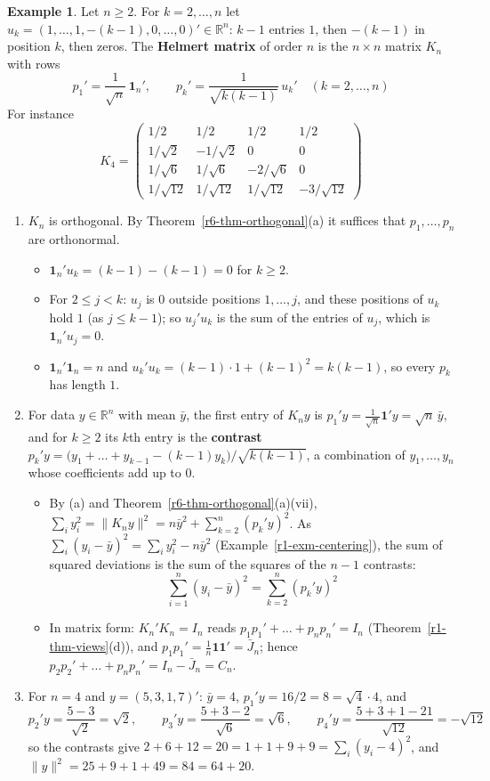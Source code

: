 \documentclass[12pt]{article}
\newcommand{\R}{\mathbb R}
\newcommand{\one}{\mathbf 1}
\theoremstyle{definition}
\newtheorem{example}[theorem]{Example}
\begin{document}
\begin{example}\label{r6-exm-helmert}
Let \(n\geqslant2\). For \(k=2,\dots,n\) let \(u_k=(1,\dots,1,-(k-1),0,\dots,0)'\in\R^n\): \(k-1\) entries \(1\),
then \(-(k-1)\) in position \(k\), then zeros. The \textbf{Helmert matrix} of order \(n\) is the \(n\times n\)
matrix \(K_n\) with rows
\[
p_1'=\frac1{\sqrt n}\,\one_n',\qquad p_k'=\frac1{\sqrt{k(k-1)}}\,u_k'\quad(k=2,\dots,n)
\]
For instance
\[
K_4=\begin{pmatrix}1/2&1/2&1/2&1/2\\1/\sqrt2&-1/\sqrt2&0&0\\1/\sqrt6&1/\sqrt6&-2/\sqrt6&0\\
1/\sqrt{12}&1/\sqrt{12}&1/\sqrt{12}&-3/\sqrt{12}\end{pmatrix}
\]
\begin{enumerate}
\item \(K_n\) is orthogonal. By Theorem~\ref{r6-thm-orthogonal}(a) it suffices that \(p_1,\dots,p_n\) are
orthonormal.
\begin{itemize}
\item \(\one_n'u_k=(k-1)-(k-1)=0\) for \(k\geqslant2\).
\item For \(2\leqslant j<k\): \(u_j\) is \(0\) outside positions \(1,\dots,j\), and these positions of \(u_k\)
hold \(1\) (as \(j\leqslant k-1\)); so \(u_j'u_k\) is the sum of the entries of \(u_j\), which is
\(\one_n'u_j=0\).
\item \(\one_n'\one_n=n\) and \(u_k'u_k=(k-1)\cdot1+(k-1)^2=k(k-1)\), so every \(p_k\) has length \(1\).
\end{itemize}
\item For data \(y\in\R^n\) with mean \(\bar y\), the first entry of \(K_ny\) is \(p_1'y=\frac1{\sqrt n}\one'y=\sqrt n\,\bar y\),
and for \(k\geqslant2\) its \(k\)th entry is the \textbf{contrast}
\(p_k'y=\bigl(y_1+\dots+y_{k-1}-(k-1)y_k\bigr)/\sqrt{k(k-1)}\), a combination of \(y_1,\dots,y_n\) whose
coefficients add up to \(0\).
\begin{itemize}
\item By (a) and Theorem~\ref{r6-thm-orthogonal}(a)(vii), \(\sum_iy_i^2=\lVert K_ny\rVert^2=n\bar y^2+\sum_{k=2}^n(p_k'y)^2\).
As \(\sum_i(y_i-\bar y)^2=\sum_iy_i^2-n\bar y^2\) (Example~\ref{r1-exm-centering}), the sum of squared
deviations is the sum of the squares of the \(n-1\) contrasts:
\[
\sum_{i=1}^n(y_i-\bar y)^2=\sum_{k=2}^n(p_k'y)^2
\]
\item In matrix form: \(K_n'K_n=I_n\) reads \(p_1p_1'+\dots+p_np_n'=I_n\) (Theorem~\ref{r1-thm-views}(d)), and
\(p_1p_1'=\frac1n\one\one'=\bar J_n\); hence \(p_2p_2'+\dots+p_np_n'=I_n-\bar J_n=C_n\).
\end{itemize}
\item For \(n=4\) and \(y=(5,3,1,7)'\): \(\bar y=4\), \(p_1'y=16/2=8=\sqrt4\cdot4\), and
\[
p_2'y=\frac{5-3}{\sqrt2}=\sqrt2,\qquad p_3'y=\frac{5+3-2}{\sqrt6}=\sqrt6,\qquad p_4'y=\frac{5+3+1-21}{\sqrt{12}}=-\sqrt{12}
\]
so the contrasts give \(2+6+12=20=1+1+9+9=\sum_i(y_i-4)^2\), and \(\lVert y\rVert^2=25+9+1+49=84=64+20\).
\end{enumerate}
\end{example}
\end{document}
